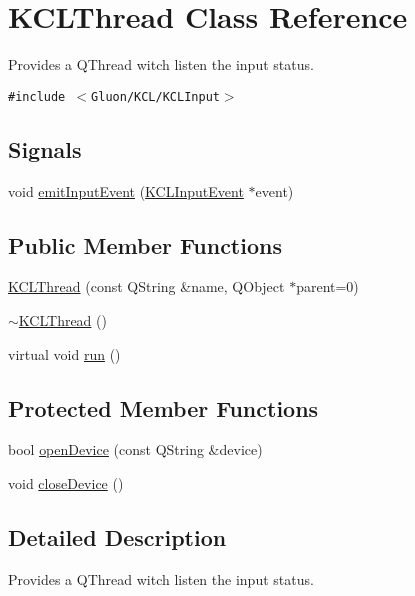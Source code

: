 \hypertarget{class_k_c_l_thread}{
\section{KCLThread Class Reference}
\label{class_k_c_l_thread}
}
Provides a QThread witch listen the input status.  


{\tt \#include $<$Gluon/KCL/KCLInput$>$}

\subsection*{Signals}
\begin{CompactItemize}
\item 
void \hyperlink{class_k_c_l_thread_318807205f19ec5cfbeee2200dbbf995}{emitInputEvent} (\hyperlink{class_k_c_l_input_event}{KCLInputEvent} $\ast$event)
\end{CompactItemize}
\subsection*{Public Member Functions}
\begin{CompactItemize}
\item 
\hyperlink{class_k_c_l_thread_233c3ccb8211c3c247acc7afa3d13381}{KCLThread} (const QString \&name, QObject $\ast$parent=0)
\item 
\hyperlink{class_k_c_l_thread_346cf94ab107d40c2b39d41ff5de6f89}{$\sim$KCLThread} ()
\item 
virtual void \hyperlink{class_k_c_l_thread_12a55f25353d1ba81fc237a1c9dc22b5}{run} ()
\end{CompactItemize}
\subsection*{Protected Member Functions}
\begin{CompactItemize}
\item 
bool \hyperlink{class_k_c_l_thread_2b5d9cafcdbbf26ceac9cc9cce9427dc}{openDevice} (const QString \&device)
\item 
void \hyperlink{class_k_c_l_thread_dc58b5a20a35371ecf539c51098411c6}{closeDevice} ()
\end{CompactItemize}


\subsection{Detailed Description}
Provides a QThread witch listen the input status. 

